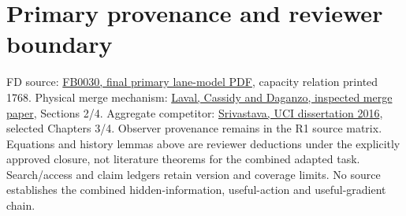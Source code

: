 \documentclass[10pt,a4paper]{article}
\begin{document}
\section*{Primary provenance and reviewer boundary}
FD source: \href{https://repository.tudelft.nl/file/File_2c4359e7-5e5a-4651-964f-6f3610ab89ae}{FB0030, final primary lane-model PDF}, capacity relation printed 1768.
Physical merge mechanism: \href{https://bpb-us-e1.wpmucdn.com/sites.gatech.edu/dist/f/3571/files/2023/03/merges.pdf}{Laval, Cassidy and Daganzo, inspected merge paper}, Sections 2/4.
Aggregate competitor: \href{https://escholarship.org/content/qt7dx478g4/qt7dx478g4.pdf}{Srivastava, UCI dissertation 2016}, selected Chapters 3/4.
Observer provenance remains in the R1 source matrix. Equations and history
lemmas above are reviewer deductions under the explicitly approved closure,
not literature theorems for the combined adapted task. Search/access and claim
ledgers retain version and coverage limits. No source establishes the combined
hidden-information, useful-action and useful-gradient chain.
\end{document}
